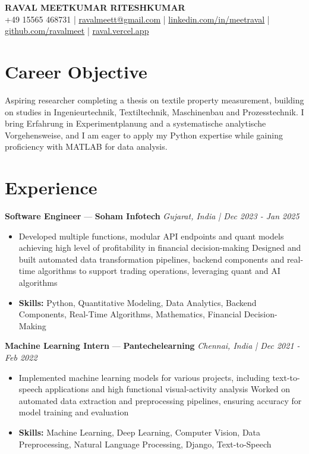 \documentclass[a4paper,10pt]{article}
\begin{document}
\begin{center}
  {\Large\bfseries RAVAL MEETKUMAR RITESHKUMAR}\\[2pt]
  {\small +49 15565 468731 \;|\; \href{mailto:ravalmeett@gmail.com}{ravalmeett@gmail.com} \;|\; \href{https://www.linkedin.com/in/meetraval/}{linkedin.com/in/meetraval} \;|\; \href{https://github.com/ravalmeet}{github.com/ravalmeet} \;|\; \href{https://raval.vercel.app/}{raval.vercel.app}}
\end{center}
\vspace{-3pt}

\section*{Career Objective}
Aspiring researcher completing a thesis on textile property measurement, building on studies in Ingenieurtechnik, Textiltechnik, Maschinenbau and Prozesstechnik. I bring Erfahrung in Experimentplanung and a systematische analytische Vorgehensweise, and I am eager to apply my Python expertise while gaining proficiency with MATLAB for data analysis.\par

\section*{Experience}
\textbf{Software Engineer} — \textbf{Soham Infotech} \hfill \textit{Gujarat, India \;|\; Dec 2023 - Jan 2025}\par
\vspace{1pt}
\begin{itemize}
  \item Developed multiple functions, modular API endpoints and quant models achieving high level of profitability in financial decision-making Designed and built automated data transformation pipelines, backend components and real-time algorithms to support trading operations, leveraging quant and AI algorithms
  \item \textbf{Skills:} Python, Quantitative Modeling, Data Analytics, Backend Components, Real-Time Algorithms, Mathematics, Financial Decision-Making
\end{itemize}
\vspace{3pt}
\textbf{Machine Learning Intern} — \textbf{Pantechelearning} \hfill \textit{Chennai, India \;|\; Dec 2021 - Feb 2022}\par
\vspace{1pt}
\begin{itemize}
  \item Implemented machine learning models for various projects, including text-to-speech applications and high functional visual-activity analysis Worked on automated data extraction and preprocessing pipelines, ensuring accuracy for model training and evaluation
  \item \textbf{Skills:} Machine Learning, Deep Learning, Computer Vision, Data Preprocessing, Natural Language Processing, Django, Text-to-Speech
\end{itemize}
\end{document}
